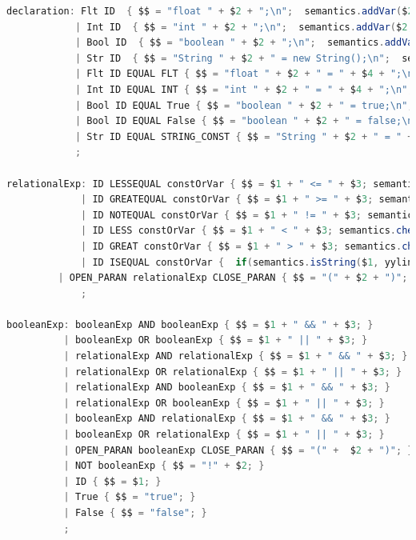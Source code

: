 \documentclass[12pt]{report}
\begin{document}
\begin{singlespace}
\begin{lstlisting}[language=Java,label=some-code,caption={flood$\_$grammar.y}]
declaration: Flt ID  { $$ = "float " + $2 + ";\n";  semantics.addVar($2, "float", yyline); }
            | Int ID  { $$ = "int " + $2 + ";\n";  semantics.addVar($2, "int", yyline); }
            | Bool ID  { $$ = "boolean " + $2 + ";\n";  semantics.addVar($2, "boolean", yyline); }
            | Str ID  { $$ = "String " + $2 + " = new String();\n";  semantics.addVar($2, "String", yyline); }
            | Flt ID EQUAL FLT { $$ = "float " + $2 + " = " + $4 + ";\n"; semantics.addVar($2, "float", yyline); }
            | Int ID EQUAL INT { $$ = "int " + $2 + " = " + $4 + ";\n"; semantics.addVar($2, "int", yyline); }
            | Bool ID EQUAL True { $$ = "boolean " + $2 + " = true;\n"; semantics.addVar($2, "boolean", yyline); }
            | Bool ID EQUAL False { $$ = "boolean " + $2 + " = false;\n"; semantics.addVar($2, "boolean", yyline); }
            | Str ID EQUAL STRING_CONST { $$ = "String " + $2 + " = " + $4 + ";\n"; semantics.addVar($2, "String", yyline); }
            ;

relationalExp: ID LESSEQUAL constOrVar { $$ = $1 + " <= " + $3; semantics.checkRelExp($1, $3, yyline); semantics.checkRelationNumber($1, yyline); }
             | ID GREATEQUAL constOrVar { $$ = $1 + " >= " + $3; semantics.checkRelExp($1, $3, yyline); semantics.checkRelationNumber($1, yyline); }
             | ID NOTEQUAL constOrVar { $$ = $1 + " != " + $3; semantics.checkRelExp($1, $3, yyline); semantics.checkRelationNotString($1, yyline); }
             | ID LESS constOrVar { $$ = $1 + " < " + $3; semantics.checkRelExp($1, $3, yyline); semantics.checkRelationNumber($1, yyline); }
             | ID GREAT constOrVar { $$ = $1 + " > " + $3; semantics.checkRelExp($1, $3, yyline); semantics.checkRelationNumber($1, yyline); }
             | ID ISEQUAL constOrVar { 	if(semantics.isString($1, yyline)){$$ = $1 + ".equals(" + $3 + ")"; semantics.checkRelationString($1,yyline); }else{$$ = $1 + " == " + $3; semantics.checkRelationNotString($1, yyline); } semantics.checkRelExp($1, $3, yyline); }
	     | OPEN_PARAN relationalExp CLOSE_PARAN { $$ = "(" + $2 + ")"; }
             ;

booleanExp: booleanExp AND booleanExp { $$ = $1 + " && " + $3; }
          | booleanExp OR booleanExp { $$ = $1 + " || " + $3; }
          | relationalExp AND relationalExp { $$ = $1 + " && " + $3; }
          | relationalExp OR relationalExp { $$ = $1 + " || " + $3; }
          | relationalExp AND booleanExp { $$ = $1 + " && " + $3; }
          | relationalExp OR booleanExp { $$ = $1 + " || " + $3; }
          | booleanExp AND relationalExp { $$ = $1 + " && " + $3; }
          | booleanExp OR relationalExp { $$ = $1 + " || " + $3; }
          | OPEN_PARAN booleanExp CLOSE_PARAN { $$ = "(" +  $2 + ")"; }
          | NOT booleanExp { $$ = "!" + $2; }
          | ID { $$ = $1; }
          | True { $$ = "true"; }
          | False { $$ = "false"; }
          ;


\end{lstlisting}
\end{singlespace}
\end{document}
